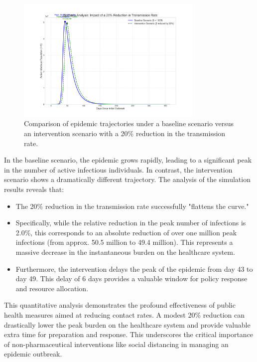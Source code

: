 \documentclass[12pt, a4paper]{article}
\begin{document}
\begin{figure}[h!]
    \centering
    \includegraphics[width=0.8\textwidth]{1/scenario_simulation.png}
    \caption{Comparison of epidemic trajectories under a baseline scenario versus an intervention scenario with a 20\% reduction in the transmission rate.}
    \label{fig:scenario_sim}
\end{figure}

In the baseline scenario, the epidemic grows rapidly, leading to a significant peak in the number of active infectious individuals. In contrast, the intervention scenario shows a dramatically different trajectory. The analysis of the simulation results reveals that:
\begin{itemize}
    \item The 20\% reduction in the transmission rate successfully "flattens the curve."
    \item Specifically, while the relative reduction in the peak number of infections is 2.0\%, this corresponds to an absolute reduction of over one million peak infections (from approx. 50.5 million to 49.4 million). This represents a massive decrease in the instantaneous burden on the healthcare system.
    \item Furthermore, the intervention delays the peak of the epidemic from day 43 to day 49. This delay of 6 days provides a valuable window for policy response and resource allocation.
\end{itemize}
This quantitative analysis demonstrates the profound effectiveness of public health measures aimed at reducing contact rates. A modest 20\% reduction can drastically lower the peak burden on the healthcare system and provide valuable extra time for preparation and response. This underscores the critical importance of non-pharmaceutical interventions like social distancing in managing an epidemic outbreak.
\end{document}
